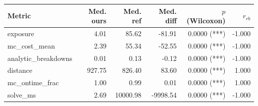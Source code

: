 \begin{tabular}{lrrrrr}
\toprule
Metric & Med. ours & Med. ref & Med. diff & $p$ (Wilcoxon) & $r_{rb}$ \\
\midrule
exposure & 4.01 & 85.62 & -81.91 & 0.0000 (***) & -1.000 \\
mc_cost_mean & 2.39 & 55.34 & -52.55 & 0.0000 (***) & -1.000 \\
analytic_breakdowns & 0.01 & 0.13 & -0.12 & 0.0000 (***) & -1.000 \\
distance & 927.75 & 826.40 & 83.60 & 0.0000 (***) & 1.000 \\
mc_ontime_frac & 1.00 & 0.99 & 0.01 & 0.0000 (***) & 1.000 \\
solve_ms & 2.69 & 10000.98 & -9998.54 & 0.0000 (***) & -1.000 \\
\bottomrule
\end{tabular}
